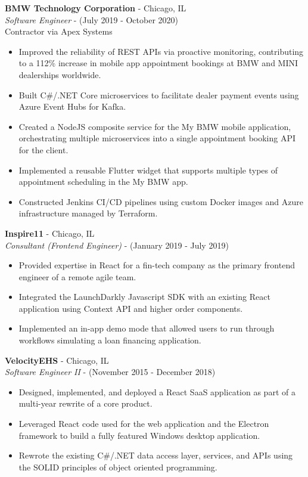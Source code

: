 \documentclass[10pt]{article}
\begin{document}
\begin{paracol}{2}
\noindent \textbf{BMW Technology Corporation} - Chicago, IL \\
\textit{Software Engineer} - {\footnotesize{(July 2019 - October 2020)}} \\
{\footnotesize{Contractor via Apex Systems}} 
\begin{itemize}
    \item Improved the reliability of REST APIs via proactive monitoring, contributing to a 112\% increase in mobile app appointment bookings at BMW and MINI dealerships worldwide.
    \item Built C\#/.NET Core microservices to facilitate dealer payment events using Azure Event Hubs for Kafka.
    \item Created a NodeJS composite service for the My BMW mobile application, orchestrating multiple microservices into a single appointment booking API for the client.
    \item Implemented a reusable Flutter widget that supports multiple types of appointment scheduling in the My BMW app.
    \item Constructed Jenkins CI/CD pipelines using custom Docker images and Azure infrastructure managed by Terraform.
\end{itemize} 


\noindent \textbf{Inspire11} - Chicago, IL \\
\textit{Consultant (Frontend Engineer)} - {\footnotesize{(January 2019 - July 2019)}} 
\begin{itemize}
    \item Provided expertise in React for a fin-tech company as the primary frontend engineer of a remote agile team.
    \item Integrated the LaunchDarkly Javascript SDK with an existing React application using Context API and higher order components.
    \item Implemented an in-app demo mode that allowed users to run through workflows simulating a loan financing application.
\end{itemize} 

\noindent \textbf{VelocityEHS} - Chicago, IL \\
\textit{Software Engineer II} - {\footnotesize{(November 2015 - December 2018)}}
\begin{itemize}
    \item Designed, implemented, and deployed a React SaaS application as part of a multi-year rewrite of a core product.
    \item Leveraged React code used for the web application and the Electron framework to build a fully featured Windows desktop application.
    \item Rewrote the existing C\#/.NET data access layer, services, and APIs using the SOLID principles of object oriented programming.
\end{itemize} 


\end{paracol}
\end{document}
